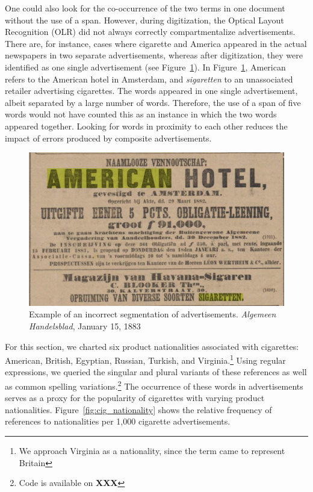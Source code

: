 \documentclass[USenglish]{article}
\begin{document}
One could also look for the co-occurrence of the two terms in one document without the use of a span. However, during digitization, the Optical Layout Recognition (OLR) did not always correctly compartmentalize advertisements. There are, for instance, cases where cigarette and America appeared in the actual newspapers in two separate advertisements, whereas after digitization, they were identified as one single advertisement (see Figure~\ref{fig:segmentation}). In Figure~\ref{fig:segmentation}, American refers to the American hotel in Amsterdam, and \textit{sigaretten} to an unassociated retailer advertising cigarettes. The words appeared in one single advertisement, albeit separated by a large number of words. Therefore, the use of a span of five words would not have counted this as an instance in which the two words appeared together. Looking for words in proximity to each other reduces the impact of errors produced by composite advertisements.

\begin{figure}%
  \centering
  \includegraphics[width=.9\textwidth]{figures/segmentation_error}%
  \caption{Example of an incorrect segmentation of advertisements. \textit{Algemeen Handelsblad}, January 15, 1883}%
  \label{fig:segmentation}%
\end{figure}

For this section, we charted six product nationalities associated with cigarettes: American, British, Egyptian, Russian, Turkish, and Virginia.\footnote{We approach Virginia as a nationality, since the term came to represent Britain} Using regular expressions, we queried the singular and plural variants of these references as well as common spelling variations.\footnote{Code is available on \textbf{XXX}} The occurrence of these words in advertisements serves as a proxy for the popularity of cigarettes with varying product nationalities. Figure~\ref{fig:cig_nationality} shows the relative frequency of references to nationalities per 1,000 cigarette advertisements. 
\end{document}
